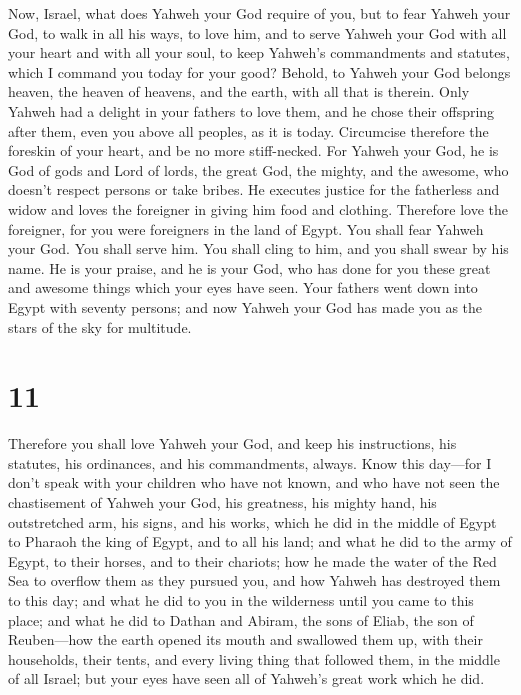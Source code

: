  Now, Israel, what does Yahweh your God require of you, but
to fear Yahweh your God, to walk in all his ways, to love him, and to
serve Yahweh your God with all your heart and with all your soul,
 to keep Yahweh's commandments and statutes, which I
command you today for your good?  Behold, to Yahweh your
God belongs heaven, the heaven of heavens, and the earth, with all that
is therein.  Only Yahweh had a delight in your fathers to
love them, and he chose their offspring after them, even you above all
peoples, as it is today.  Circumcise therefore the foreskin
of your heart, and be no more stiff-necked.  For Yahweh
your God, he is God of gods and Lord of lords, the great God, the
mighty, and the awesome, who doesn't respect persons or take bribes.
 He executes justice for the fatherless and widow and loves
the foreigner in giving him food and clothing.  Therefore
love the foreigner, for you were foreigners in the land of Egypt.
 You shall fear Yahweh your God. You shall serve him. You
shall cling to him, and you shall swear by his name.  He is
your praise, and he is your God, who has done for you these great and
awesome things which your eyes have seen.  Your fathers
went down into Egypt with seventy persons; and now Yahweh your God has
made you as the stars of the sky for multitude.

\hypertarget{section-10}{%
\section{11}\label{section-10}}

 Therefore you shall love Yahweh your God, and keep his
instructions, his statutes, his ordinances, and his commandments,
always.  Know this day---for I don't speak with your
children who have not known, and who have not seen the chastisement of
Yahweh your God, his greatness, his mighty hand, his outstretched arm,
 his signs, and his works, which he did in the middle of
Egypt to Pharaoh the king of Egypt, and to all his land; 
and what he did to the army of Egypt, to their horses, and to their
chariots; how he made the water of the Red Sea to overflow them as they
pursued you, and how Yahweh has destroyed them to this day; 
and what he did to you in the wilderness until you came to this place;
 and what he did to Dathan and Abiram, the sons of Eliab,
the son of Reuben---how the earth opened its mouth and swallowed them
up, with their households, their tents, and every living thing that
followed them, in the middle of all Israel;  but your eyes
have seen all of Yahweh's great work which he did.

